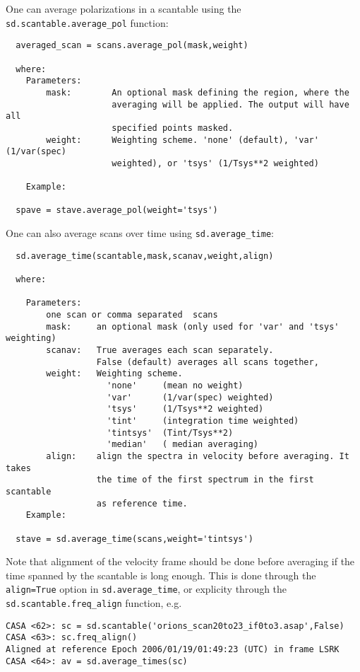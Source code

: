 One can average polarizations in a scantable using the
{\tt sd.scantable.average\_pol} function:
\small
\begin{verbatim}
  averaged_scan = scans.average_pol(mask,weight)

  where:
    Parameters:
        mask:        An optional mask defining the region, where the
                     averaging will be applied. The output will have all
                     specified points masked.
        weight:      Weighting scheme. 'none' (default), 'var' (1/var(spec)
                     weighted), or 'tsys' (1/Tsys**2 weighted)

    Example:

  spave = stave.average_pol(weight='tsys')
\end{verbatim}
\normalsize

One can also average scans over time using {\tt sd.average\_time}:
\small
\begin{verbatim}
  sd.average_time(scantable,mask,scanav,weight,align)

  where:

    Parameters:
        one scan or comma separated  scans
        mask:     an optional mask (only used for 'var' and 'tsys' weighting)
        scanav:   True averages each scan separately.
                  False (default) averages all scans together,
        weight:   Weighting scheme.
                    'none'     (mean no weight)
                    'var'      (1/var(spec) weighted)
                    'tsys'     (1/Tsys**2 weighted)
                    'tint'     (integration time weighted)
                    'tintsys'  (Tint/Tsys**2)
                    'median'   ( median averaging)
        align:    align the spectra in velocity before averaging. It takes
                  the time of the first spectrum in the first scantable
                  as reference time.
    Example:
  
  stave = sd.average_time(scans,weight='tintsys')
\end{verbatim}
\normalsize

Note that alignment of the velocity frame should be done before
averaging if the time spanned by the scantable is 
long enough.  This is done through the {\tt align=True} option in
{\tt sd.average\_time}, or explicity through the
{\tt sd.scantable.freq\_align} function, e.g.
\small
\begin{verbatim}
CASA <62>: sc = sd.scantable('orions_scan20to23_if0to3.asap',False)
CASA <63>: sc.freq_align()
Aligned at reference Epoch 2006/01/19/01:49:23 (UTC) in frame LSRK
CASA <64>: av = sd.average_times(sc)
\end{verbatim}
\normalsize


